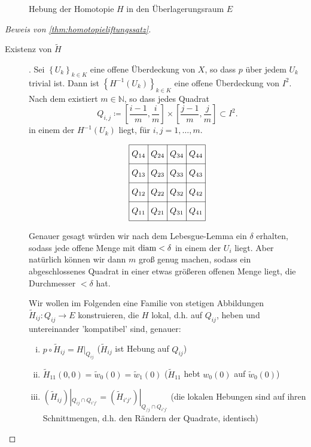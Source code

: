 \begin{figure}[ht]
    \centering
    \caption{Hebung der Homotopie $H$ in den Überlagerungsraum  $E$}
    \label{fig:hebung-von-homotopie}
\end{figure}


\begin{proof}[Beweis von \autoref{thm:homotopieliftungssatz}]
    \begin{description}
        \item[Existenz von $\tilde{H}$]. Sei $\left \{U_k\right\}_{k\in K}$ eine offene Überdeckung von $X$, so dass  $p$ über jedem  $U_k$ trivial ist. Dann ist  $\left \{H^{-1}(U_k)\right\} _{k \in K}$ eine offene Überdeckung von $I^2$. Nach dem  existiert $m\in \mathbb{N}$, so dass jedes Quadrat
            \[
            Q_{i,j} \coloneqq  \left[ \frac{i-1}{m}, \frac{i}{m} \right] \times \left[ \frac{j-1}{m}, \frac{j}{m} \right] \subset I^2
            .\] 
            in einem der $H^{-1}(U_k)$ liegt, für $i,j = 1,\ldots,m$.

\[
    \begin{tikzpicture}[scale=0.8]
        \draw (0,0) grid (4,4);
        \foreach \x in {1,2,3,4}  {   
            \foreach \y in {1,2,3,4} {
                \node (A\x\y) at (\x-0.5,\y-0.5) {$Q_{\x\y}$};
            }
        }
    \end{tikzpicture}
        \]

            \begin{remark*}
                Genauer gesagt würden wir nach dem Lebesgue-Lemma ein $\delta$ erhalten, sodass jede offene Menge mit  $\operatorname{diam} < \delta$ in einem der $U_i$ liegt. Aber natürlich können wir dann  $m$ groß genug machen, sodass ein abgeschlossenes Quadrat in einer etwas größeren offenen Menge liegt, die Durchmesser  $<\delta$ hat.
            \end{remark*}
            Wir wollen im Folgenden eine Familie von stetigen Abbildungen $\tilde{H}_{ij}\colon  Q_{ij}\to E$ konstruieren, die $H$ lokal, d.h. auf  $Q_{ij}$, heben und untereinander 'kompatibel' sind, genauer:
            \begin{enumerate}[i)]
                \item $ p \circ  \tilde{H}_{ij} = H|_{Q_{ij}}$ ($\tilde{H}_{ij}$ ist Hebung auf $Q_{ij}$)
                \item $\tilde{H}_{11}(0,0) = \tilde{w}_0(0) = \tilde{w}_1(0)$ ($\tilde{H}_{11}$ hebt $w_0(0)$ auf $\tilde{w}_0(0)$)
                \item $(\tilde{H}_{ij})|_{Q_{ij} \cap  Q_{i'j'}} = (\tilde{H}_{i'j'})|_{Q_{/j} \cap  Q_{i'j'}}$ (die lokalen Hebungen sind auf ihren Schnittmengen, d.h. den Rändern der Quadrate, identisch)
            \end{enumerate}


\end{description}
\end{proof}
